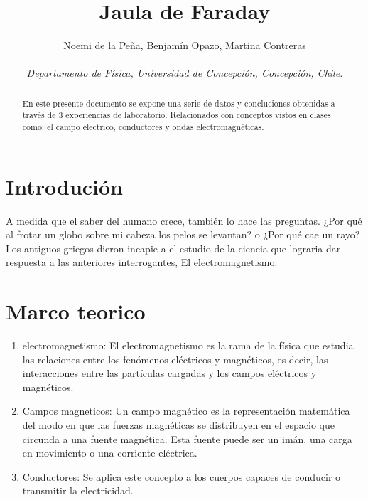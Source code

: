 \documentclass[]{article}
\title{Jaula de Faraday}
\author{Noemi de la Peña, Benjamín Opazo, Martina Contreras \\ \\
 \textit{ Departamento de Física, Universidad de Concepción, Concepción, Chile. }}
\date{}
\begin{document}
\maketitle 



    


\begin{abstract}
En este presente documento se expone una serie de datos y concluciones 
obtenidas a través de 3 experiencias de laboratorio. Relacionados con conceptos vistos en clases como: el campo electrico,
conductores y ondas electromagnéticas.
\end{abstract}

\begin{multicols*}{2}

\section*{Introdución}
    A medida que el saber del humano crece, también lo hace las preguntas.
    ¿Por qué al frotar un globo sobre mi cabeza los pelos se levantan? o 
    ¿Por qué cae un rayo?
    Los antiguos griegos dieron incapie a el estudio de la ciencia que 
    lograria dar respuesta a las anteriores interrogantes, El electromagnetismo.

%

\section*{Marco teorico}
\begin{enumerate}
    \item electromagnetismo: El electromagnetismo es la rama de la física que estudia las relaciones entre los fenómenos eléctricos y magnéticos, es decir, las interacciones entre las partículas cargadas y los campos eléctricos y magnéticos.
    
    \item Campos magneticos: Un campo magnético es la representación matemática del modo en que las fuerzas magnéticas se distribuyen en el espacio que circunda a una fuente magnética. Esta fuente puede ser un imán, una carga en movimiento o una corriente eléctrica.
    
    \item Conductores: Se aplica este concepto a los cuerpos capaces de conducir o transmitir la electricidad.
    

\end{enumerate}
\end{multicols*}
\end{document}
